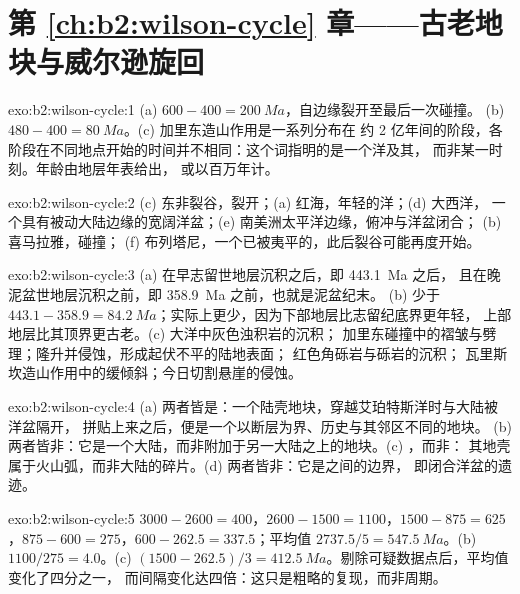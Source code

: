\section*{第 \ref{ch:b2:wilson-cycle} 章——古老地块与威尔逊旋回}

\begin{solution}{exo:b2:wilson-cycle:1}
(a) $600 - 400 = \qty{200}{Ma}$，自边缘裂开至最后一次碰撞。
(b) $480 - 400 = \qty{80}{Ma}$。(c) 加里东造山作用是一系列分布在
约 2 亿年间的阶段，各阶段在不同地点开始的时间并不相同：这个词指明的是一个洋及其，
而非某一时刻。年龄由地层年表给出，
或以百万年计。
\end{solution}

\begin{solution}{exo:b2:wilson-cycle:2}
(c) 东非裂谷，裂开；(a) 红海，年轻的洋；(d) 大西洋，
一个具有被动大陆边缘的宽阔洋盆；(e) 南美洲太平洋边缘，俯冲与洋盆闭合；
(b) 喜马拉雅，碰撞；
(f) 布列塔尼，一个已被夷平的，此后裂谷可能再度开始。
\end{solution}

\begin{solution}{exo:b2:wilson-cycle:3}
(a) 在早志留世地层沉积之后，即 \qty{443.1}{Ma} 之后，
且在晚泥盆世地层沉积之前，即 \qty{358.9}{Ma} 之前，也就是泥盆纪末。
(b) 少于 $443.1 - 358.9 = \qty{84.2}{Ma}$；实际上更少，因为下部地层比志留纪底界更年轻，
上部地层比其顶界更古老。(c) 大洋中灰色浊积岩的沉积；
加里东碰撞中的褶皱与劈理；隆升并侵蚀，形成起伏不平的陆地表面；
红色角砾岩与砾岩的沉积；
瓦里斯坎造山作用中的缓倾斜；今日切割悬崖的侵蚀。
\end{solution}

\begin{solution}{exo:b2:wilson-cycle:4}
(a) 两者皆是：一个陆壳地块，穿越艾珀特斯洋时与大陆被洋盆隔开，
拼贴上来之后，便是一个以断层为界、历史与其邻区不同的地块。
(b) 两者皆非：它是一个大陆，而非附加于另一大陆之上的地块。(c) ，而非：
其地壳属于火山弧，而非大陆的碎片。(d) 两者皆非：它是之间的边界，
即闭合洋盆的遗迹。
\end{solution}

\begin{solution}{exo:b2:wilson-cycle:5}
$3000 - 2600 = 400$，$2600 - 1500 = 1100$，$1500 - 875 = 625$，$875 - 600 = 275$，$600 -
262.5 = 337.5$；平均值 $2737.5/5 = \qty{547.5}{Ma}$。(b) $1100/275 = 4.0$。(c) $(1500 -
262.5)/3 = \qty{412.5}{Ma}$。剔除可疑数据点后，平均值变化了四分之一，
而间隔变化达四倍：这只是粗略的复现，而非周期。
\end{solution}

